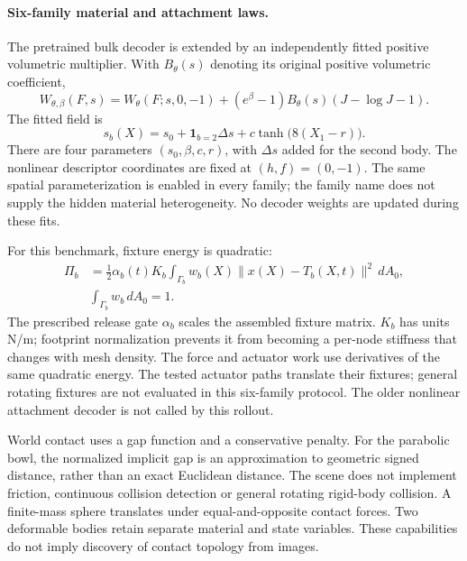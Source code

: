 \paragraph{Six-family material and attachment laws.}
The pretrained bulk decoder is extended by an independently fitted positive
volumetric multiplier. With $B_\theta(s)$ denoting its original positive
volumetric coefficient,
\begin{equation}
 W_{\theta,\beta}(F,s)=W_\theta(F;s,0,-1)
 +(e^\beta-1)B_\theta(s)(J-\log J-1).
\end{equation}
The fitted field is
\begin{equation}
 s_b(X)=s_0+\mathbf{1}_{b=2}\Delta s+
 c\tanh\bigl(8(X_1-r)\bigr).
\end{equation}
There are four parameters $(s_0,\beta,c,r)$, with $\Delta s$ added for the
second body. The nonlinear descriptor coordinates are fixed at $(h,f)=(0,-1)$.
The same spatial parameterization is enabled in every family; the family name
does not supply the hidden material heterogeneity. No decoder weights are
updated during these fits.

For this benchmark, fixture energy is quadratic:
\begin{align}
 \Pi_b&=\frac12\alpha_b(t)K_b
 \int_{\Gamma_b}w_b(X)\|x(X)-T_b(X,t)\|^2\,dA_0,
 \nonumber\\
 &\int_{\Gamma_b}w_b\,dA_0=1.
\end{align}
The prescribed release gate $\alpha_b$ scales the assembled fixture matrix.
$K_b$ has units N/m; footprint normalization prevents it from becoming a
per-node stiffness that changes with mesh density. The force and actuator
work use derivatives of the same quadratic energy. The tested actuator
paths translate their fixtures; general rotating fixtures are not evaluated
in this six-family protocol. The older nonlinear attachment decoder is not
called by this rollout.

World contact uses a gap function and a conservative penalty. For the
parabolic bowl, the normalized implicit gap is an approximation to geometric
signed distance, rather than an exact Euclidean distance. The scene does
not implement friction, continuous collision detection or general rotating
rigid-body collision. A finite-mass sphere translates under equal-and-opposite
contact forces. Two deformable bodies retain separate material and state
variables. These capabilities do not imply discovery of contact topology
from images.


